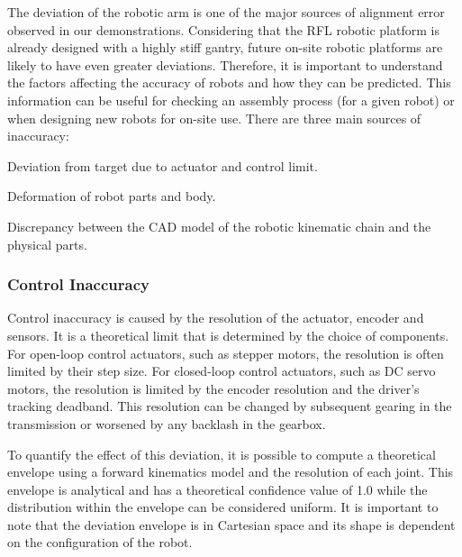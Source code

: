 The deviation of the robotic arm is one of the major sources of alignment error observed in our demonstrations. Considering that the RFL robotic platform is already designed with a highly stiff gantry, future on-site robotic platforms are likely to have even greater deviations. Therefore, it is important to understand the factors affecting the accuracy of robots and how they can be predicted. This information can be useful for checking an assembly process (for a given robot) or when designing new robots for on-site use. There are three main sources of inaccuracy:

\begin{description}[style=unboxed] %

	\item [Control Inaccuracy] Deviation from target due to actuator and control limit.

	\item [Mechanical Inaccuracy] Deformation of robot parts and body.

	\item [Forward Kinematics Inaccuracy] Discrepancy between the CAD model of the robotic kinematic chain and the physical parts. 

\end{description}

\subsubsection{Control Inaccuracy}
\label{subsubsection:new-hypo-control-inaccuracy}

Control inaccuracy is caused by the resolution of the actuator, encoder and sensors. It is a theoretical limit that is determined by the choice of components. For open-loop control actuators, such as stepper motors, the resolution is often limited by their step size. For closed-loop control actuators, such as DC servo motors, the resolution is limited by the encoder resolution and the driver's tracking deadband. This resolution can be changed by subsequent gearing in the transmission or worsened by any backlash in the gearbox. 

To quantify the effect of this deviation, it is possible to compute a theoretical envelope using a forward kinematics model and the resolution of each joint. This envelope is analytical and has a theoretical confidence value of 1.0 while the distribution within the envelope can be considered uniform. It is important to note that the deviation envelope is in Cartesian space and its shape is dependent on the configuration of the robot.

